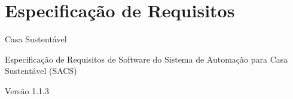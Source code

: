 %
%
%
%
%
%
%
%
%
%
%
%
%
%
%
%
%
%
%
%
%
%
%  
%


\chapter{Especificação de Requisitos}


Casa Sustentável

Especificação de Requisitos de Software
do Sistema de Automação para Casa Sustentável (SACS)
 
 
Versão 1.1.3
 
 



